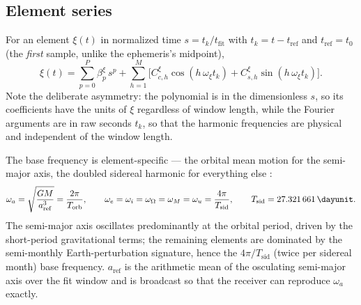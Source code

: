 \subsection{Element series}

For an element $\xi(t)$ in normalized time $s = t_k/t_\mathrm{fit}$ with
$t_k = t - t_\mathrm{ref}$ and $t_\mathrm{ref} = t_0$ (the \emph{first}
sample, unlike the ephemeris's midpoint),
\begin{equation}
  \label{eq:eph-alm-series}
  \xi(t) = \sum_{p=0}^{P}\beta^{\xi}_p\,s^p
    + \sum_{h=1}^{M}\Big[C^{\xi}_{c,h}\cos(h\,\omega_\xi t_k)
                        + C^{\xi}_{s,h}\sin(h\,\omega_\xi t_k)\Big].
\end{equation}
Note the deliberate asymmetry: the polynomial is in the dimensionless $s$, so
its coefficients have the units of $\xi$ regardless of window length, while
the Fourier arguments are in raw seconds $t_k$, so that the harmonic
frequencies are physical and independent of the window length.

The base frequency is element-specific --- the orbital mean motion for the
semi-major axis, the doubled sidereal harmonic for everything else
\citep[Eq.~8.1]{iiyama2026thesis}:
\begin{equation}
  \label{eq:eph-alm-freq}
  \omega_a = \sqrt{\frac{GM}{a_\mathrm{ref}^3}} = \frac{2\pi}{T_\mathrm{orb}},
  \qquad
  \omega_{e} = \omega_{i} = \omega_{\Omega} = \omega_{M} = \omega_{u}
    = \frac{4\pi}{T_\mathrm{sid}},
  \qquad T_\mathrm{sid} = \SI{27.321661}{\dayunit}.
\end{equation}
The semi-major axis oscillates predominantly at the orbital period, driven by
the short-period gravitational terms; the remaining elements are dominated by
the semi-monthly Earth-perturbation signature, hence the $4\pi/T_\mathrm{sid}$
(twice per sidereal month) base frequency. $a_\mathrm{ref}$ is the arithmetic
mean of the osculating semi-major axis over the fit window and is broadcast so
that the receiver can reproduce $\omega_a$ exactly.

